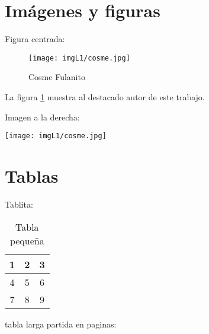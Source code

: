 \section{Imágenes y figuras}


Figura centrada:
\begin{figure}[ht]
\centering
\texttt{[image: imgL1/cosme.jpg]}
\caption{Cosme Fulanito}
\label{fig:cosme}
\end{figure}
La figura \ref{fig:cosme} muestra al destacado autor de este trabajo.

Imagen a la derecha:

\begin{flushright}
\texttt{[image: imgL1/cosme.jpg]}
\end{flushright}




\section{Tablas}
Tablita:

\begin{table}[ht]
\begin{center}
    \begin{tabular}{ c | c | c }
        1 & 2 & 3 \\ 
        \hline 
        4 & 5 & 6 \\  
        7 & 8 & 9    
    \end{tabular}
\end{center}
\caption{Tabla pequeña}
\end{table}
tabla larga partida en paginas:\\



